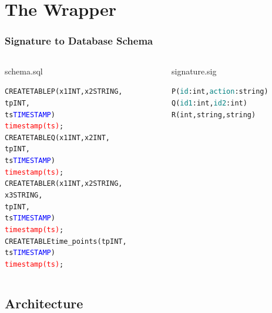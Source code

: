\section{The Wrapper}


\begin{frame}[fragile]
    \frametitle{Signature to Database Schema}
\begin{columns}
    \begin{column}{0.6\textwidth}
        \vspace{-0.5cm}
        \begin{center}
            schema.sql
        \end{center}
        \vspace{-0.7cm}
\begin{alltt}
CREATE TABLE P(x1 INT, x2 STRING,
               tp INT,
               ts \textcolor{blue}{TIMESTAMP})
               \textcolor{red}{timestamp(ts)};
CREATE TABLE Q(x1 INT, x2 INT,
               tp INT,
               ts \textcolor{blue}{TIMESTAMP})
               \textcolor{red}{timestamp(ts)};
CREATE TABLE R(x1 INT,x2 STRING,
               x3 STRING,
               tp INT,
               ts \textcolor{blue}{TIMESTAMP})
               \textcolor{red}{timestamp(ts)};
CREATE TABLE time_points(tp INT,
                         ts \textcolor{blue}{TIMESTAMP})
                         \textcolor{red}{timestamp(ts)};

\end{alltt}
    \end{column}
    \begin{column}{0.45\textwidth}
        \begin{center}
            signature.sig
        \end{center}
        \vspace{-0.7cm}
\begin{alltt}
P(\textcolor{teal}{id}:int, \textcolor{teal}{action}:string)
Q(\textcolor{teal}{id1}:int, \textcolor{teal}{id2}:int)
R(int, string, string)
\end{alltt}
\vspace{1.1cm}
        
    \end{column}
\end{columns}
\end{frame}

\subsection{Architecture}


